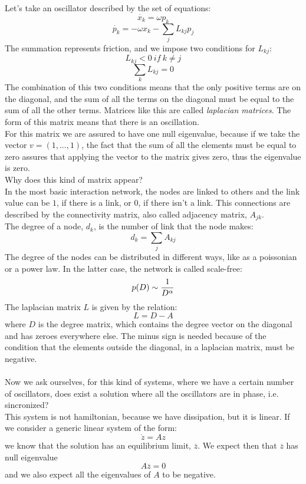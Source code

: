 Let's take an oscillator described by the set of equations:
$$
	\dot{x_k} = \omega p_k 
$$
$$
	\dot{p_k} = -\omega x_k - \sum_j L_{kj} p_j
$$
The summation represents friction, and we impose two conditions for $L_{kj}$:
$$
	L_{kj} < 0 \ if \ k\neq j
$$
$$
	\sum_k L_{kj} = 0
$$
The combination of this two conditions means that the only positive terms are on the diagonal, and the sum of all the terms on the diagonal must be equal to the sum of all the other terms. Matrices like this are called \emph{laplacian matrices}. The form of this matrix means that there is an oscillation. \\
For this matrix we are assured to have one null eigenvalue, because if we take the vector $v = (1,...,1)$, the fact that the sum of all the elements must be equal to zero assures that applying the vector to the matrix gives zero, thus the eigenvalue is zero. \\
Why does this kind of matrix appear? \\ 
In the most basic interaction network, the nodes are linked to others and the link value can be $1$, if there is a link, or $0$, if there isn't a link. This connections are described by the connectivity matrix, also called adjacency matrix, $A_{jk}$. \\
The degree of a node, $d_k$, is the number of link that the node makes:
$$
	d_k = \sum_j A_{kj}
$$
The degree of the nodes can be distributed in different ways, like as a poissonian or a power law. In the latter case, the network is called scale-free:
$$
	p(D) \sim \frac{1}{D^\alpha}
$$
The laplacian matrix $L$ is given by the relation:
$$
	L = D - A
$$
where $D$ is the degree matrix, which contains the degree vector on the diagonal and has zeroes everywhere else. The minus sign is needed because of the condition that the elements outside the diagonal, in a laplacian matrix, must be negative. \\ \\
Now we ask ourselves, for this kind of systems, where we have a certain number of oscillators, does exist a solution where all the oscillators are in phase, i.e. sincronized? \\
This system is not hamiltonian, because we have dissipation, but it is linear. If we consider a generic linear system of the form:
$$
	\dot{z} = A z
$$
we know that the solution has an equilibrium limit, $\overline{z}$. We expect then that $\overline{z}$ has null eigenvalue
$$
	A \overline{z} = 0
$$
and we also expect all the eigenvalues of $A$ to be negative. \\
